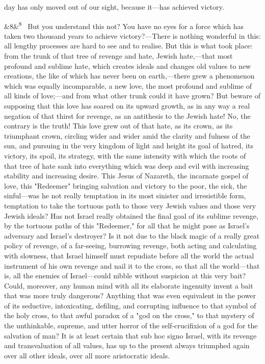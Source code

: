 \documentclass[12pt]{article}
\newcommand{\para}[1][]{\par\noindent\ifx&#1&\else\textsuperscript{\footnotesize #1}~\fi}
\begin{document}
day has only moved out of our sight, because it---has achieved victory.

\para[8] But you understand this not? You have no eyes for a force which has taken two thousand years to achieve victory?---There is nothing wonderful in this: all lengthy processes are hard to see and to realise. But this is what took place: from the trunk of that tree of revenge and hate, Jewish hate,---that most profound and sublime hate, which creates ideals and changes old values to new creations, the like of which has never been on earth,---there grew a phenomenon which was equally incomparable, a new love, the most profound and sublime of all kinds of love;---and from what other trunk could it have grown? But beware of supposing that this love has soared on its upward growth, as in any way a real negation of that thirst for revenge, as an antithesis to the Jewish hate! No, the contrary is the truth! This love grew out of that hate, as its crown, as its triumphant crown, circling wider and wider amid the clarity and fulness of the sun, and pursuing in the very kingdom of light and height its goal of hatred, its victory, its spoil, its strategy, with the same intensity with which the roots of that tree of hate sank into everything which was deep and evil with increasing stability and increasing desire. This Jesus of Nazareth, the incarnate gospel of love, this "Redeemer" bringing salvation and victory to the poor, the sick, the sinful---was he not really temptation in its most sinister and irresistible form, temptation to take the tortuous path to those very Jewish values and those very Jewish ideals? Has not Israel really obtained the final goal of its sublime revenge, by the tortuous paths of this "Redeemer," for all that he might pose as Israel's adversary and Israel's destroyer? Is it not due to the black magic of a really great policy of revenge, of a far-seeing, burrowing revenge, both acting and calculating with slowness, that Israel himself must repudiate before all the world the actual instrument of his own revenge and nail it to the cross, so that all the world---that is, all the enemies of Israel---could nibble without suspicion at this very bait? Could, moreover, any human mind with all its elaborate ingenuity invent a bait that was more truly dangerous? Anything that was even equivalent in the power of its seductive, intoxicating, defiling, and corrupting influence to that symbol of the holy cross, to that awful paradox of a "god on the cross," to that mystery of the unthinkable, supreme, and utter horror of the self-crucifixion of a god for the salvation of man? It is at least certain that sub hoc signo Israel, with its revenge and transvaluation of all values, has up to the present always triumphed again over all other ideals, over all more aristocratic ideals.
\end{document}
